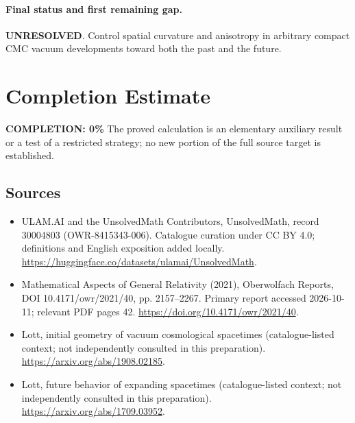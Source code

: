 \documentclass[11pt]{article}
\begin{document}
\paragraph{Final status and first remaining gap.}
\textbf{UNRESOLVED}. Control spatial curvature and anisotropy in arbitrary compact CMC vacuum developments toward both the past and the future.

\section{Completion Estimate}
\noindent\textbf{COMPLETION: 0\%}
The proved calculation is an elementary auxiliary result or a test of a restricted strategy; no new portion of the full source target is established.

\subsection{Sources}
\begin{itemize}
\item[\hypertarget{source:30004803:1}{S1}] ULAM.AI and the UnsolvedMath Contributors, UnsolvedMath, record 30004803 (OWR-8415343-006). Catalogue curation under CC BY 4.0; definitions and English exposition added locally.
\url{https://huggingface.co/datasets/ulamai/UnsolvedMath}.
\item[\hypertarget{source:30004803:2}{S2}] Mathematical Aspects of General Relativity (2021), Oberwolfach Reports, DOI 10.4171/owr/2021/40, pp. 2157--2267. Primary report accessed 2026-10-11; relevant PDF pages 42.
\url{https://doi.org/10.4171/owr/2021/40}.
\item[\hypertarget{source:30004803:3}{S3}] Lott, initial geometry of vacuum cosmological spacetimes (catalogue-listed context; not independently consulted in this preparation).
\url{https://arxiv.org/abs/1908.02185}.
\item[\hypertarget{source:30004803:4}{S4}] Lott, future behavior of expanding spacetimes (catalogue-listed context; not independently consulted in this preparation).
\url{https://arxiv.org/abs/1709.03952}.
\end{itemize}
\label{end:30004803}
\end{document}
